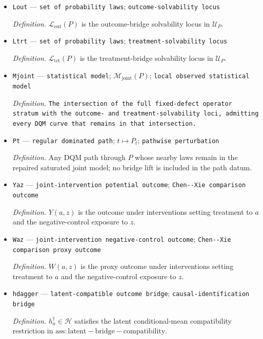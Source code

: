 \documentclass{article}
\begin{document}
\begin{itemize}
  \item \texttt{Lout} --- \texttt{set of probability laws}; \texttt{outcome-\allowbreak{}solvability locus}
  \par\smallskip\noindent\emph{Definition.} \(\mathcal L_{\mathrm{out}}(P)\) is the outcome-bridge solvability locus in \(\mathcal U_P\).
  \item \texttt{Ltrt} --- \texttt{set of probability laws}; \texttt{treatment-\allowbreak{}solvability locus}
  \par\smallskip\noindent\emph{Definition.} \(\mathcal L_{\mathrm{trt}}(P)\) is the treatment-bridge solvability locus in \(\mathcal U_P\).
  \item \texttt{Mjoint} --- \texttt{statistical model}; \(\mathcal M_{\mathrm{joint}}(P)\); \texttt{local observed statistical model}
  \par\smallskip\noindent\emph{Definition.} \texttt{The intersection of the full fixed-\allowbreak{}defect operator stratum with the outcome-\allowbreak{} and treatment-\allowbreak{}solvability loci,\allowbreak{} admitting every DQM curve that remains in that intersection.}
  \item \texttt{Pt} --- \texttt{regular dominated path}; \(t\mapsto P_t\); \texttt{pathwise perturbation}
  \par\smallskip\noindent\emph{Definition.} Any DQM path through \(P\) whose nearby laws remain in the repaired saturated joint model; no bridge lift is included in the path datum.
  \item \texttt{Yaz} --- \texttt{joint-\allowbreak{}intervention potential outcome}; \texttt{Chen-\allowbreak{}-\allowbreak{}Xie comparison outcome}
  \par\smallskip\noindent\emph{Definition.} \(Y(a,z)\) is the outcome under interventions setting treatment to \(a\) and the negative-control exposure to \(z\).
  \item \texttt{Waz} --- \texttt{joint-\allowbreak{}intervention negative-\allowbreak{}control outcome}; \texttt{Chen-\allowbreak{}-\allowbreak{}Xie comparison proxy outcome}
  \par\smallskip\noindent\emph{Definition.} \(W(a,z)\) is the proxy outcome under interventions setting treatment to \(a\) and the negative-control exposure to \(z\).
  \item \texttt{hdagger} --- \texttt{latent-\allowbreak{}compatible outcome bridge}; \texttt{causal-\allowbreak{}identification bridge}
  \par\smallskip\noindent\emph{Definition.} \(h_a^\dagger\in\mathcal H\) satisfies the latent conditional-mean compatibility restriction in \(\mathrm{ass:latent-bridge-compatibility}\).

\end{itemize}
\end{document}

